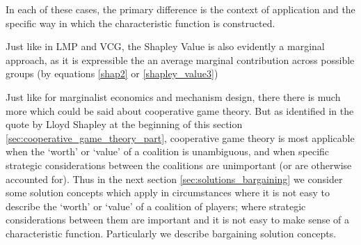 In each of these cases, the primary difference is the context of application and the specific way in which the characteristic function is constructed.


Just like in LMP and VCG, the Shapley Value is also evidently a marginal approach, as it is expressible the an average marginal contribution across possible groups (by equations \ref{shap2} or \ref{shapley_value3})


Just like for marginalist economics and mechanism design, there there is much more which could be said about cooperative game theory.
But as identified in the quote by Lloyd Shapley at the beginning of this section \ref{sec:cooperative_game_theory_part}, cooperative game theory is most applicable when the `worth' or `value' of a coalition is unambiguous, and when specific strategic considerations between the coalitions are unimportant (or are otherwise accounted for).
Thus in the next section \ref{sec:solutions_bargaining} we consider some solution concepts which apply in circumstances where it is not easy to describe the `worth' or `value' of a coalition of players; where strategic considerations between them are important and it is not easy to make sense of a characteristic function.
Particularly we describe bargaining solution concepts.


